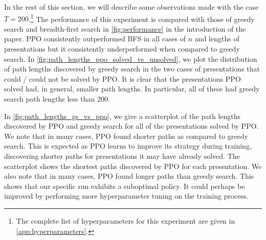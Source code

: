 In the rest of this section, we will describe some observations made with the case $T=200$.\footnote{
The complete list of hyperparameters for this experiment are given in \autoref{app:hyperparameters}.}
The performance of this experiment is compared with those of greedy search and breadth-first search in \autoref{fig:performance} in the introduction of the paper. PPO consistently outperformed BFS in all cases of $n$ and lengths of presentations but it consistently underperformed when compared to greedy search. In \autoref{fig:path_lengths_ppo_solved_vs_unsolved}, we plot the distribution of path lengths discovered by greedy search in the two cases of presentations that could / could not be solved by PPO. It is clear that the presentations PPO solved had, in general, smaller path lengths. In particular, all of these had greedy search path lengths less than $200$.

In \autoref{fig:path_lengths_gs_vs_ppo}, we give a scatterplot of the path lengths discovered by PPO and greedy search for all of the presentations solved by PPO. We note that in many cases, PPO found shorter paths as compared to greedy search. This is expected as PPO learns to improve its strategy during training, discovering shorter paths for presentations it may have already solved. The scatterplot shows the shortest paths discovered by PPO for each presentation. We also note that in many cases, PPO found longer paths than greedy search. This shows that our specific run exhibits a suboptimal policy. It could perhaps be improved by performing more hyperparameter tuning on the training process.

